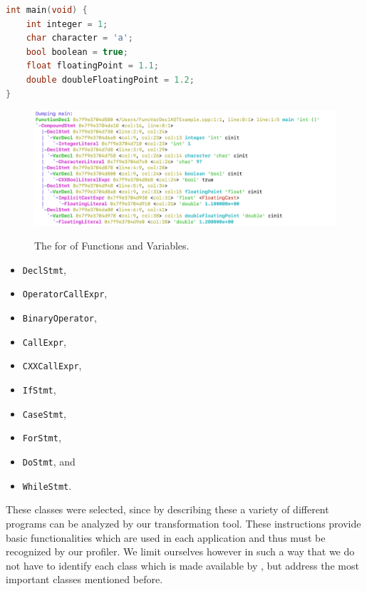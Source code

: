 \begin{lstlisting}[float, language=C++, caption=Example Code Showing the Definition of Functions and Variables., label=lst:c:ast_declstmt_code]
int main(void) {
    int integer = 1;
    char character = 'a';
    bool boolean = true;
    float floatingPoint = 1.1;
    double doubleFloatingPoint = 1.2;
}
\end{lstlisting}

\begin{figure}[t]
    \centering
    \caption{The \AST for \DECLS of Functions and Variables.}
    \includegraphics[width=1\textwidth]{graphics/c_ast_declstmt.png}
    \label{fig:c:ast_declstmt}
\end{figure}

\begin{itemize}[noitemsep, nolistsep]
    \item \lstinline{DeclStmt},
    \item \lstinline{OperatorCallExpr},
    \item \lstinline{BinaryOperator},
    \item \lstinline{CallExpr},
    \item \lstinline{CXXCallExpr},
    \item \lstinline{IfStmt},
    \item \lstinline{CaseStmt},
    \item \lstinline{ForStmt},
    \item \lstinline{DoStmt}, and
    \item \lstinline{WhileStmt}.
\end{itemize}

These classes were selected, since by describing these a variety of different programs can be analyzed by our transformation tool. These instructions provide basic functionalities which are used in each application and thus must be recognized by our profiler. We limit ourselves however in such a way that we do not have to identify each class which is made available by \CLANG, but address the most important classes mentioned before. 

